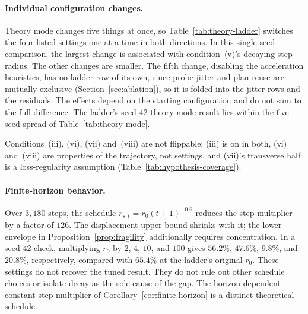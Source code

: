 \paragraph{Individual configuration changes.}
Theory mode changes five things at once, so Table~\ref{tab:theory-ladder} switches the
four listed settings one at a time in both directions. In this single-seed comparison, the largest change is associated with
condition~(v)'s decaying step radius. The other changes are smaller. The fifth change, disabling the acceleration heuristics, has no ladder row of
its own, since probe jitter and plan reuse are mutually exclusive
(Section~\ref{sec:ablation}), so it is folded into the jitter rows and the residuals.
The effects depend on the starting configuration and do not sum to the
full difference. The ladder's seed-42 theory-mode result lies within the
five-seed spread of Table~\ref{tab:theory-mode}.

\begin{table}[ht]
\centering
\caption{Effects of individual configuration changes toward Assumption~\ref{asm:main} (SNN, seed 42, test accuracy at the validation-selected checkpoint). Upper block starts from the tuned configuration and adds one hypothesis; lower block starts from theory mode and removes one. Each $\Delta$ is against the first row of its own block, not against the row above.}
\label{tab:theory-ladder}
\small

\vspace{0.3em}

{\raggedright\scriptsize Conditions~(iii), (vi), (vii) and~(viii) are not flippable:
(iii) is on in both, (vi) and~(viii) are properties of the trajectory, not
settings, and (vii)'s transverse half is a loss-regularity assumption
(Table~\ref{tab:hypothesis-coverage}).\par}
\end{table}

\paragraph{Finite-horizon behavior.}
Over $3{,}180$ steps, the schedule $r_{s,t}=r_0(t+1)^{-0.6}$ reduces the
step multiplier by a factor of $126$. The displacement upper bound shrinks
with it; the lower envelope in Proposition~\ref{prop:fragility} additionally
requires concentration. In a seed-42 check, multiplying $r_0$ by
$2$, $4$, $10$, and $100$ gives $56.2\%$, $47.6\%$, $9.8\%$, and $20.8\%$,
respectively, compared with $65.4\%$ at the ladder's original $r_0$.
These settings do not recover the tuned result. They do not rule out other
schedule choices or isolate decay as the sole cause of the gap.
The horizon-dependent constant step multiplier of
Corollary~\ref{cor:finite-horizon} is a distinct theoretical schedule.

